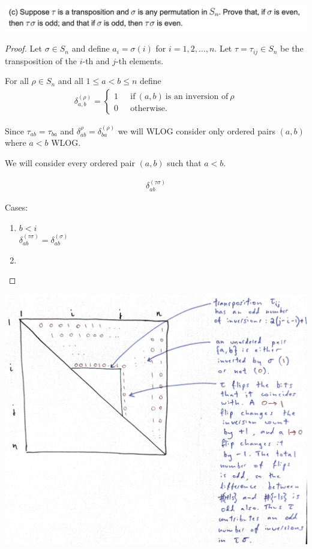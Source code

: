 \begin{mdframed}
\includegraphics[width=400pt]{img/algebra--nf--2-179c.png}
\end{mdframed}

\begin{proof}
  Let $\sigma \in S_n$ and define $a_i = \sigma(i)$ for $i = 1, 2, \ldots, n$. Let
  $\tau = \tau_{ij} \in S_n$ be the transposition of the $i$-th and $j$-th elements.

  For all $\rho \in S_n$ and all $1 \leq a < b \leq n$ define
  \begin{align*}
    \delta^{(\rho)}_{a,b} =
    \begin{cases}
      1 &~~~\text{if}~(a, b)~\text{is an inversion of}~\rho\\
      0 &~~~\text{otherwise}.
    \end{cases}
  \end{align*}

  Since $\tau_{ab} = \tau_{ba}$ and $\delta^{\rho}_{ab} = \delta^{(\rho)}_{ba}$ we will WLOG consider only ordered
  pairs $(a, b)$ where $a < b$ WLOG.


  We will consider every ordered pair $(a, b)$ such that $a < b$.

  \begin{align*}
    \delta^{(\tau\sigma)}_{ab}
  \end{align*}

  Cases:



  \begin{enumerate}
  \item $b < i$ \\
    $\delta^{(\tau\sigma)}_{ab} = \delta^{(\sigma)}_{ab}$
  \item
  \end{enumerate}
\end{proof}

\begin{mdframed}
\includegraphics[width=400pt]{img/abstract-algebra--nf--2-4dc0.png}
\end{mdframed}


